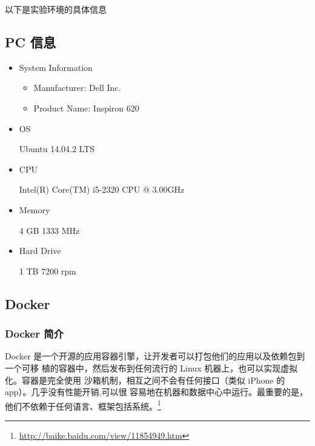 \documentclass[11pt]{article}
\begin{document}
以下是实验环境的具体信息

\subsection{PC 信息}
\label{sec-2-1}
\begin{itemize}
\item System Information
\begin{itemize}
\item Manufacturer: Dell Inc.
\item Product Name: Inspiron 620
\end{itemize}
\item OS

Ubuntu 14.04.2 LTS

\item CPU

Intel(R) Core(TM) i5-2320 CPU @ 3.00GHz

\item Memory

4 GB 1333 MHz

\item Hard Drive

1 TB 7200 rpm
\end{itemize}
\subsection{Docker}
\label{sec-2-2}
\subsubsection{Docker 简介}
\label{sec-2-2-1}
Docker 是一个开源的应用容器引擎，让开发者可以打包他们的应用以及依赖包到一个可移
植的容器中，然后发布到任何流行的 Linux 机器上，也可以实现虚拟化。容器是完全使用
沙箱机制，相互之间不会有任何接口（类似 iPhone 的 app）。几乎没有性能开销,可以很
容易地在机器和数据中心中运行。最重要的是，他们不依赖于任何语言、框架包括系统。\footnote{\url{http://baike.baidu.com/view/11854949.htm}}
\end{document}
